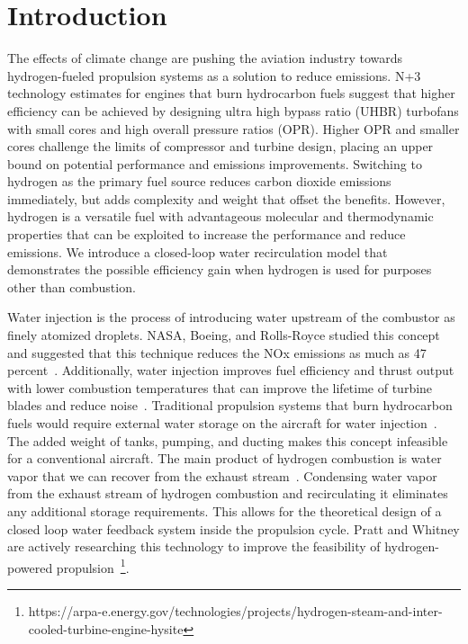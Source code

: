 \documentclass[conf]{new-aiaa}
\begin{document}
\section{Introduction}
The effects of climate change are pushing the aviation industry towards hydrogen-fueled propulsion systems as a solution to reduce emissions.
N+3 technology estimates for engines that burn hydrocarbon fuels suggest that higher efficiency can be achieved by designing ultra high bypass ratio (UHBR) turbofans with small cores and high overall pressure ratios (OPR).
Higher OPR and smaller cores challenge the limits of compressor and turbine design, placing an upper bound on potential performance and emissions improvements.
Switching to hydrogen as the primary fuel source reduces carbon dioxide emissions immediately, but adds complexity and weight that offset the benefits.
However, hydrogen is a versatile fuel with advantageous molecular and thermodynamic properties that can be exploited to increase the performance and reduce emissions.
We introduce a closed-loop water recirculation model that demonstrates the possible efficiency gain when hydrogen is used for purposes other than combustion.

Water injection is the process of introducing water upstream of the combustor as finely atomized droplets.
NASA, Boeing, and Rolls-Royce studied this concept and suggested that this technique reduces the NOx emissions as much as 47 percent~\cite{Daggett2010}.
Additionally, water injection improves fuel efficiency and thrust output with lower combustion temperatures that can improve the lifetime of turbine blades and reduce noise~\cite{Daggett2010}.
Traditional propulsion systems that burn hydrocarbon fuels would require external water storage on the aircraft for water injection~\cite{Mourouzidis2015}.
The added weight of tanks, pumping, and ducting makes this concept infeasible for a conventional aircraft.
The main product of hydrogen combustion is water vapor that we can recover from the exhaust stream~\cite{Strom2002}.
Condensing water vapor from the exhaust stream of hydrogen combustion and recirculating it eliminates any additional storage requirements.
This allows for the theoretical design of a closed loop water feedback system inside the propulsion cycle.
Pratt and Whitney are actively researching this technology to improve the feasibility of hydrogen-powered propulsion~\footnote{https://arpa-e.energy.gov/technologies/projects/hydrogen-steam-and-inter-cooled-turbine-engine-hysite}.
\end{document}
